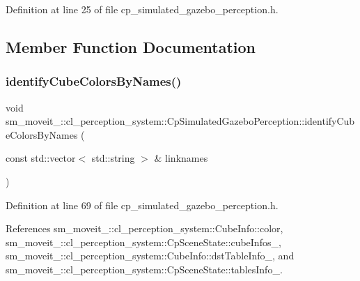 Definition at line 25 of file cp\+\_\+simulated\+\_\+gazebo\+\_\+perception.\+h.



\subsection{Member Function Documentation}
\mbox{\label{classsm__moveit__4_1_1cl__perception__system_1_1CpSimulatedGazeboPerception_aac02fd742b0074f62d8909ce00a02d3b}} 
\subsubsection{\texorpdfstring{identify\+Cube\+Colors\+By\+Names()}{identifyCubeColorsByNames()}}
{\footnotesize\ttfamily void sm\+\_\+moveit\+\_\+::cl\+\_\+perception\+\_\+system\+::\+Cp\+Simulated\+Gazebo\+Perception\+::identify\+Cube\+Colors\+By\+Names (\begin{DoxyParamCaption}\item[{const std\+::vector$<$ std\+::string $>$ \&}]{linknames }\end{DoxyParamCaption})\hspace{0.3cm}{\ttfamily [inline]}}



Definition at line 69 of file cp\+\_\+simulated\+\_\+gazebo\+\_\+perception.\+h.



References sm\+\_\+moveit\+\_\+::cl\+\_\+perception\+\_\+system\+::\+Cube\+Info\+::color, sm\+\_\+moveit\+\_\+::cl\+\_\+perception\+\_\+system\+::\+Cp\+Scene\+State\+::cube\+Infos\+\_\+, sm\+\_\+moveit\+\_\+::cl\+\_\+perception\+\_\+system\+::\+Cube\+Info\+::dst\+Table\+Info\+\_\+, and sm\+\_\+moveit\+\_\+::cl\+\_\+perception\+\_\+system\+::\+Cp\+Scene\+State\+::tables\+Info\+\_\+.


